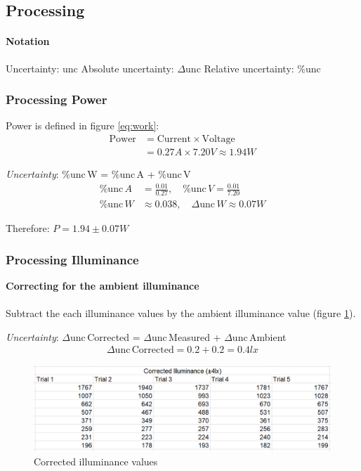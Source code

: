 \documentclass[a4paper,12pt]{article}
\newcommand{\absun}{\Delta \text{unc}\,}
\newcommand{\relun}{\% \text{unc}\,}
\newcommand{\paragraphnl}[1]{\textbf{#1}\\\\}
\begin{document}
\subsection{Processing}
\paragraph{Notation}

Uncertainty: unc \quad Absolute uncertainty: $\Delta$unc \quad Relative uncertainty: \%unc


\subsubsection{Processing Power}
Power is defined in figure \ref{eq:work}:
\begin{align*}
\text{Power} &= \text{Current} \times \text{Voltage}\\
        &= 0.27\si{A} \times 7.20\si{V} \approx 1.94 \si{W}
\end{align*}

\textit{Uncertainty}: $\relun$W =  $\relun$A +  $\relun$V
\begin{align*}
    \relun A &= \frac{0.01}{0.27},\quad \relun V = \frac{0.01}{7.20}\\
    \relun \si{W} &\approx 0.038,\quad \absun \si{W} \approx 0.07\si{W}
\end{align*}

Therefore: $P = 1.94 \pm 0.07 \si{W}$

\subsubsection{Processing Illuminance}

\paragraphnl{Correcting for the ambient illuminance}
Subtract the each illuminance values by the ambient illuminance value (figure \ref{fig:corrected}).

\textit{Uncertainty}: $\absun$Corrected = $\absun$Measured + $\absun$Ambient
\begin{align*}
     \absun \text{Corrected} = 0.2 + 0.2 = 0.4\si{lx}
\end{align*}

\begin{figure}[H]
    \centering
    \includegraphics[scale=0.5]{assets/correcteddata.png}
    \caption{Corrected illuminance values}
    \label{fig:corrected}
\end{figure}
\end{document}
